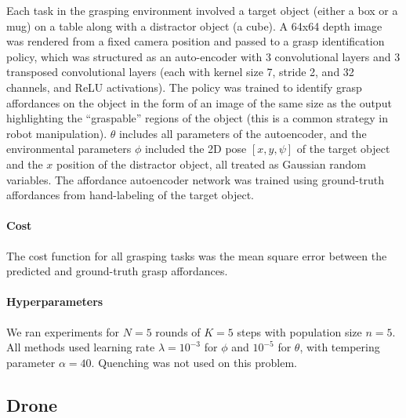 Each task in the grasping environment involved a target object (either a box or a mug) on a table along with a distractor object (a cube). A 64x64 depth image was rendered from a fixed camera position and passed to a grasp identification policy, which was structured as an auto-encoder with 3 convolutional layers and 3 transposed convolutional layers (each with kernel size 7, stride 2, and 32 channels, and ReLU activations). The policy was trained to identify grasp affordances on the object in the form of an image of the same size as the output highlighting the ``graspable'' regions of the object (this is a common strategy in robot manipulation). $\theta$ includes all parameters of the autoencoder, and the environmental parameters $\phi$ included the 2D pose $[x, y, \psi]$ of the target object and the $x$ position of the distractor object, all treated as Gaussian random variables. The affordance autoencoder network was trained using ground-truth affordances from hand-labeling of the target object.

\paragraph{Cost} The cost function for all grasping tasks was the mean square error between the predicted and ground-truth grasp affordances.

\paragraph{Hyperparameters} We ran experiments for $N=5$ rounds of $K=5$ steps with population size $n=5$. All methods used learning rate $\lambda = 10^{-3}$ for $\phi$ and $10^{-5}$ for $\theta$, with tempering parameter $\alpha = 40$. Quenching was not used on this problem.

\subsection{Drone}

